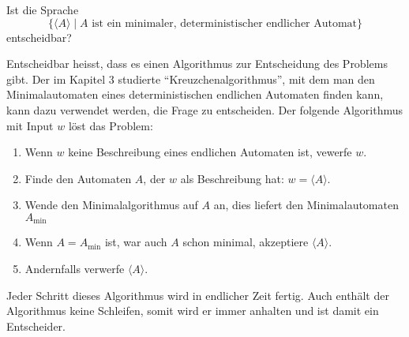 Ist die Sprache
\[
\{
\langle A\rangle
\mid
\text{$A$ ist ein minimaler, deterministischer endlicher Automat}
\}
\]
entscheidbar?

\begin{loesung}
Entscheidbar heisst, dass es einen Algorithmus zur Entscheidung des
Problems gibt.
Der im Kapitel 3 studierte ``Kreuzchenalgorithmus'', mit dem man den
Minimalautomaten eines deterministischen endlichen Automaten finden
kann, kann dazu verwendet werden, die Frage zu entscheiden.
Der folgende Algorithmus mit Input $w$ löst das Problem:
\begin{enumerate}
\item
Wenn $w$ keine Beschreibung eines endlichen Automaten ist, vewerfe $w$.
\item
Finde den Automaten $A$, der $w$ als Beschreibung hat: $w=\langle A\rangle$.
\item
Wende den Minimalalgorithmus auf $A$ an, dies liefert den
Minimalautomaten
$A_\text{min}$
\item
Wenn $A=A_{\text{min}}$ ist, war auch $A$ schon minimal, akzeptiere
$\langle A\rangle$.
\item
Andernfalls verwerfe $\langle A\rangle $.
\end{enumerate}
Jeder Schritt dieses Algorithmus wird in endlicher Zeit fertig.
Auch enthält der Algorithmus keine Schleifen, somit wird er immer
anhalten und ist damit ein Entscheider.
\end{loesung}
